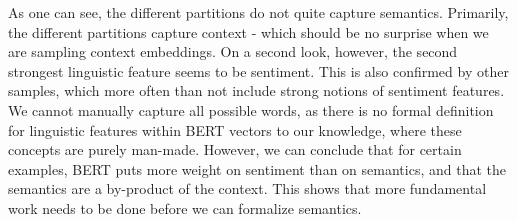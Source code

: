 \documentclass[a4paper,12pt,twoside,openright]{report}
\begin{document}
\begin{tcolorbox}
\label{fig:example_arms_negative_crossed}
\end{tcolorbox}

\quad

As one can see, the different partitions do not quite capture semantics.
Primarily, the different partitions capture context - which should be no surprise when we are sampling context embeddings.
On a second look, however, the second strongest linguistic feature seems to be sentiment. 
This is also confirmed by other samples, which more often than not include strong notions of sentiment features.
We cannot manually capture all possible words, as there is no formal definition for linguistic features within BERT vectors to our knowledge, where these concepts are purely man-made. 
However, we can conclude that for certain examples, BERT puts more weight on sentiment than on semantics, and that the semantics are a by-product of the context.
This shows that more fundamental work needs to be done before we can formalize semantics.
\end{document}
